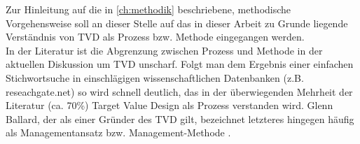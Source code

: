 %
%
%
%
%
%

Zur Hinleitung auf die in \cref{ch:methodik} beschriebene, methodische Vorgehensweise soll an dieser Stelle auf das in dieser Arbeit zu Grunde liegende Verständnis von \ac{TVD} als Prozess bzw. Methode eingegangen werden.\\
In der Literatur ist die Abgrenzung zwischen Prozess und Methode in der aktuellen Diskussion um TVD unscharf. Folgt man dem Ergebnis einer einfachen Stichwortsuche in einschlägigen wissenschaftlichen Datenbanken (z.B. reseachgate.net) so wird schnell deutlich, das in der überwiegenden Mehrheit der Literatur (ca. 70\%) Target Value Design als Prozess verstanden wird.
Glenn Ballard, der als einer Gründer des \ac{TVD} gilt, bezeichnet letzteres hingegen häufig als Managementansatz bzw. Management-Methode \autocite[]{}.\\

